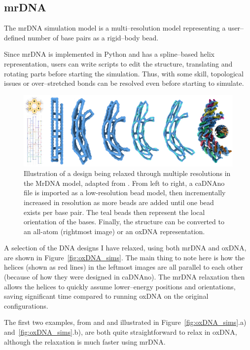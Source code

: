 \subsection{mrDNA}
\label{sec:mrdna}
The mrDNA simulation model \cite{maffeo2019mrdna} is a multi--resolution model representing a user--defined number of base pairs as a rigid--body bead.

Since mrDNA is implemented in Python and has a spline--based helix representation, users can write scripts to edit the structure, translating and rotating parts before starting the simulation. Thus, with some skill, topological issues or over--stretched bonds can be resolved even before starting to simulate.

\begin{figure}[ht]
  \begin{center}
    \includegraphics[width=\textwidth]{figures/mrDNA.jpg}
    \caption{Illustration of a design being relaxed through multiple resolutions in the MrDNA model, adapted from \cite{maffeo2019mrdna}. From left to right, a caDNAno file is imported as a low-resolution bead model, then incrementally increased in resolution as more beads are added until one bead exists per base pair. The teal beads then represent the local orientation of the bases. Finally, the structure can be converted to an all-atom (rightmost image) or an oxDNA representation.}
    \label{fig:mrdna}
  \end{center}
\end{figure}

A selection of the DNA designs I have relaxed, using both mrDNA and oxDNA, are shown in Figure~\ref{fig:oxDNA_sims}. The main thing to note here is how the helices (shown as red lines) in the leftmost images are all parallel to each other (because of how they were designed in caDNAno). The mrDNA relaxation then allows the helices to quickly assume lower--energy positions and orientations, saving significant time compared to running oxDNA on the original configurations.

The first two examples, from \cite{gerling2015dynamic} and \cite{zadegan2012smallbox} and illustrated in Figure~\ref{fig:oxDNA_sims}.a) and~\ref{fig:oxDNA_sims}.b), are both quite straightforward to relax in oxDNA, although the relaxation is much faster using mrDNA.

